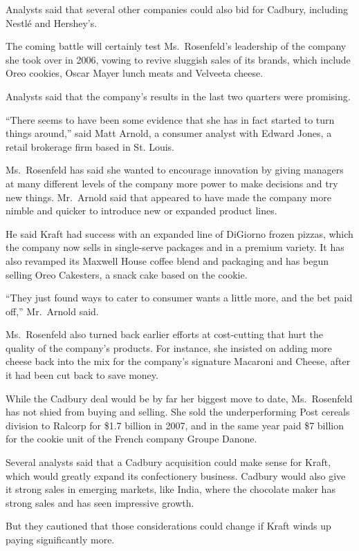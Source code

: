 ﻿\documentclass[12pt]{article}
\begin{document}
Analysts said that several other companies could also bid for Cadbury, including Nestl\'e and
Hershey's.

The coming battle will certainly test Ms.~Rosenfeld's leadership of the company she took over in
2006, vowing to revive sluggish sales of its brands, which include Oreo cookies, Oscar Mayer lunch
meats and Velveeta cheese.

Analysts said that the company's results in the last two quarters were promising.

``There seems to have been some evidence that she has in fact started to turn things around,'' said
Matt Arnold, a consumer analyst with Edward Jones, a retail brokerage firm based in St. Louis.

Ms.~Rosenfeld has said she wanted to encourage innovation by giving managers at many different
levels of the company more power to make decisions and try new things. Mr.~Arnold said that appeared
to have made the company more nimble\cite{nimble} and quicker to introduce new or expanded product
lines.

He said Kraft had success with an expanded line of DiGiorno frozen pizzas, which the company now
sells in single-serve packages and in a premium variety. It has also revamped its Maxwell House
coffee blend and packaging and has begun selling Oreo Cakesters, a snack cake based on the cookie.

``They just found ways to cater to consumer wants a little more, and the bet paid off,'' Mr.~Arnold
said.

Ms.~Rosenfeld also turned back earlier efforts at cost-cutting that hurt the quality of the
company's products. For instance, she insisted on adding more cheese back into the mix for the
company's signature Macaroni and Cheese, after it had been cut back to save money.

While the Cadbury deal would be by far her biggest move to date, Ms.~Rosenfeld has not shied from
buying and selling. She sold the underperforming Post cereals division to Ralcorp for \$1.7 billion
in 2007, and in the same year paid \$7 billion for the cookie unit of the French company Groupe
Danone.

Several analysts said that a Cadbury acquisition could make sense for Kraft, which would greatly
expand its confectionery\cite{confectionery} business. Cadbury would also give it strong sales in
emerging markets, like India, where the chocolate maker has strong sales and has seen impressive
growth.

But they cautioned that those considerations could change if Kraft winds up paying significantly
more.
\end{document}
